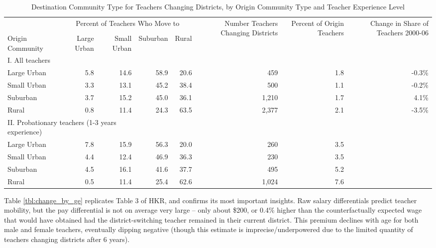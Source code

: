 \documentclass[]{article}
\begin{document}
\begin{sidewaystable}[htbp]
\centering
\begin{tabular}{lrrrrrrr}
  \hline
 & \multicolumn{4}{c}{\multirow{2}{*}{Percent of Teachers Who Move to}} & \multirow{4}{*}{\parbox{0.09\linewidth}{Number Teachers Changing Districts}} & \multirow{4}{*}{\parbox{0.07\linewidth}{Percent of Origin Teachers}} & \multirow{4}{*}{\parbox{0.07\linewidth}{Change in Share of Teachers 2000-06}}\\
 & \multicolumn{4}{c}{} & & & \\ \cline{2-5}
& & & & & & & \\
Origin Community & Large Urban & Small Urban & Suburban & Rural &  &  &  \\ 
  \hline
I. All teachers & & & & & & & \\
\quad Large Urban & 5.8 & 14.6 & 58.9 & 20.6 & 459 & 1.8 & -0.3\% \\ 
  \quad Small Urban & 3.3 & 13.1 & 45.2 & 38.4 & 500 & 1.1 & -0.2\% \\ 
  \quad Suburban & 3.7 & 15.2 & 45.0 & 36.1 & 1,210 & 1.7 & 4.1\% \\ 
  \quad Rural & 0.8 & 11.4 & 24.3 & 63.5 & 2,377 & 2.1 & -3.5\% \\ 
\multicolumn{3}{l}{II. Probationary teachers (1-3 years experience)} & & & & & \\
  \quad Large Urban & 7.8 & 15.9 & 56.3 & 20.0 & 260 & 3.5 &  \\ 
  \quad Small Urban & 4.4 & 12.4 & 46.9 & 36.3 & 230 & 3.5 &  \\ 
  \quad Suburban & 4.5 & 16.1 & 41.6 & 37.7 & 495 & 5.2 &  \\ 
  \quad Rural & 0.5 & 11.4 & 25.4 & 62.6 & 1,024 & 7.6 &  \\ 
   \hline
\end{tabular}
\caption{Destination Community Type for Teachers Changing Districts, by Origin Community Type and Teacher Experience Level} 
\label{tbl:markov}
\end{sidewaystable}

Table \ref{tbl:change_by_ge} replicates Table 3 of HKR, and confirms its
most important insights. Raw salary differentials predict teacher
mobility, but the pay differential is not on average very large -- only
about \$200, or 0.4\% higher than the counterfactually expected wage
that would have obtained had the district-switching teacher remained in
their current district. This premium declines with age for both male and
female teachers, eventually dipping negative (though this estimate is
imprecise/underpowered due to the limited quantity of teachers changing
districts after 6 years).
\end{document}
